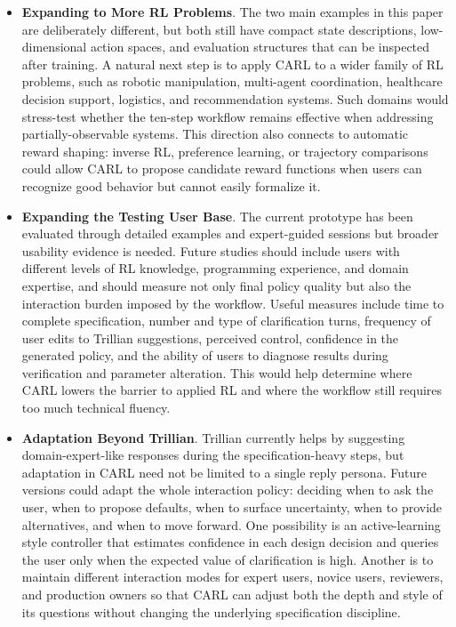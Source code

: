 \documentclass[mnsc,sglanonrev]{informs4}
\begin{document}
\begin{itemize}
\item \textbf{Expanding to More RL Problems}. The two main examples in this paper are deliberately different, but both still have compact state descriptions, low-dimensional action spaces, and evaluation structures that can be inspected after training. A natural next step is to apply CARL to a wider family of RL problems, such as robotic manipulation, multi-agent coordination, healthcare decision support, logistics, and recommendation systems. Such domains would stress-test whether the ten-step workflow remains effective when addressing partially-observable systems. This direction also connects to automatic reward shaping: inverse RL, preference learning, or trajectory comparisons could allow CARL to propose candidate reward functions when users can recognize good behavior but cannot easily formalize it.
\item \textbf{Expanding the Testing User Base}. The current prototype has been evaluated through detailed examples and expert-guided sessions but broader usability evidence is needed. Future studies should include users with different levels of RL knowledge, programming experience, and domain expertise, and should measure not only final policy quality but also the interaction burden imposed by the workflow. Useful measures include time to complete specification, number and type of clarification turns, frequency of user edits to Trillian suggestions, perceived control, confidence in the generated policy, and the ability of users to diagnose results during verification and parameter alteration. This would help determine where CARL lowers the barrier to applied RL and where the workflow still requires too much technical fluency.
\item \textbf{Adaptation Beyond Trillian}. Trillian currently helps by suggesting domain-expert-like responses during the specification-heavy steps, but adaptation in CARL need not be limited to a single reply persona. Future versions could adapt the whole interaction policy: deciding when to ask the user, when to propose defaults, when to surface uncertainty, when to provide alternatives, and when to move forward. One possibility is an active-learning style controller that estimates confidence in each design decision and queries the user only when the expected value of clarification is high. Another is to maintain different interaction modes for expert users, novice users, reviewers, and production owners so that CARL can adjust both the depth and style of its questions without changing the underlying specification discipline.

\end{itemize}
\end{document}
